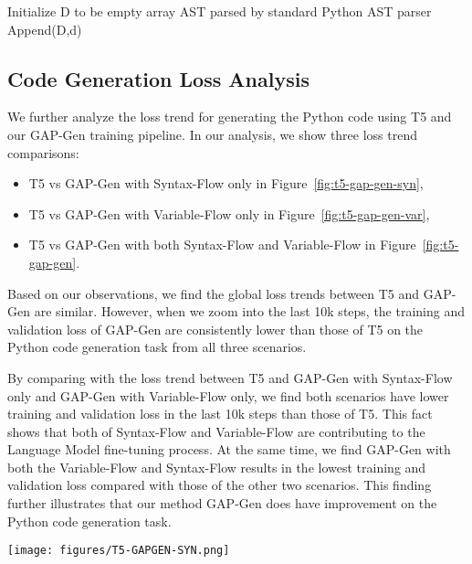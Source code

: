 \documentclass[11pt]{article}
\begin{document}
\begin{algorithm}[ht!]
\caption{Fine-tuning Language Model with Syntax-Flow}\label{alg:wordy}
\begin{algorithmic}[1]
 \State Initialize D to be empty array
  \State  AST parsed by standard Python AST parser
  \State 
  \State Append(D,d)
 \EndFor
  \State  
  \State 
  \State 
 \EndFor
\State \Return 
\end{algorithmic}
\end{algorithm}

\subsection{Code Generation Loss Analysis}
We further analyze the loss trend for generating the Python code using T5 and our GAP-Gen training pipeline. In our analysis, we show three loss trend comparisons: 
\begin{itemize}
    \item T5 vs GAP-Gen with Syntax-Flow only in Figure~\ref{fig:t5-gap-gen-syn},
    \item T5 vs GAP-Gen with Variable-Flow only in Figure~\ref{fig:t5-gap-gen-var},
    \item T5 vs GAP-Gen with both Syntax-Flow and Variable-Flow in Figure~\ref{fig:t5-gap-gen}.
\end{itemize}

Based on our observations, we find the global loss trends between T5 and GAP-Gen are similar. However, when we zoom into the last 10k steps, the training and validation loss of GAP-Gen are consistently lower than those of T5 on the Python code generation task from all three scenarios. 

By comparing with the loss trend between T5 and GAP-Gen with Syntax-Flow only and GAP-Gen with Variable-Flow only, we find both scenarios have lower training and validation loss in the last 10k steps than those of T5. This fact shows that both of Syntax-Flow and Variable-Flow are contributing to the Language Model fine-tuning process. At the same time, we find GAP-Gen with both the Variable-Flow and Syntax-Flow results in the lowest training and validation loss compared with those of the other two scenarios. This finding further illustrates that our method GAP-Gen does have improvement on the Python code generation task. 
\begin{figure*}[ht] 
\centering
\texttt{[image: figures/T5-GAPGEN-SYN.png]}
\vspace{-10pt}
\caption{Loss comparison visualization between T5 and GAP-Gen using Syntax-Flow only.}
\label{fig:t5-gap-gen-syn}
\end{figure*}
\end{document}
